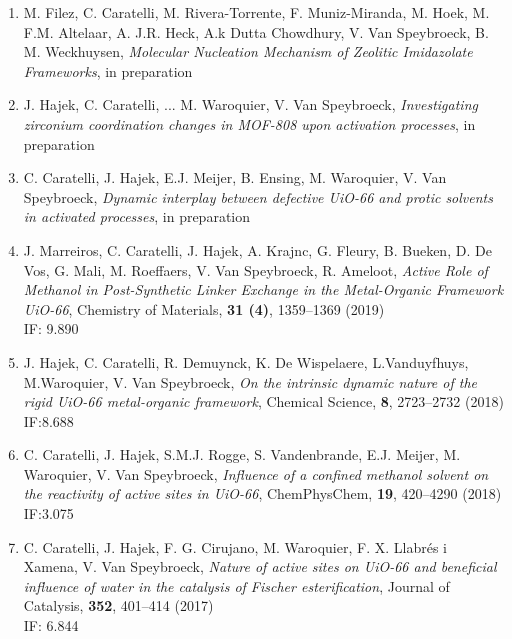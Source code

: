 \begin{enumerate}
\item
M. Filez, C. Caratelli, M. Rivera-Torrente, F. Muniz-Miranda, M. Hoek, M. F.M. Altelaar, A. J.R. Heck, A.k Dutta Chowdhury, V. Van Speybroeck, B. M. Weckhuysen, 
\textit{Molecular Nucleation Mechanism of Zeolitic Imidazolate Frameworks}, in preparation\\

\item
J. Hajek, C. Caratelli, ... M. Waroquier, V. Van Speybroeck, 
\textit{Investigating zirconium coordination changes in MOF-808 upon activation processes}, in preparation\\ 

\item
C. Caratelli, J. Hajek, E.J. Meijer, B. Ensing, M. Waroquier, V. Van Speybroeck, 
\textit{Dynamic interplay between defective UiO-66 and protic solvents in activated processes}, in preparation\\ 

\item
J. Marreiros, C. Caratelli, J. Hajek, A. Krajnc, G. Fleury, B. Bueken, D. De Vos, G. Mali, M. Roeffaers, V. Van Speybroeck, R. Ameloot, 
\textit{Active Role of Methanol in Post-Synthetic Linker Exchange in the Metal-Organic Framework UiO-66}, Chemistry of Materials, \textbf{31 (4)}, 1359--1369 (2019)\\ 
IF: 9.890

\item
J. Hajek, C. Caratelli, R. Demuynck, K. De Wispelaere, L.Vanduyfhuys, M.Waroquier, V. Van Speybroeck, 
\textit{On the intrinsic dynamic nature of the rigid UiO-66 metal-organic framework},  Chemical Science, \textbf{8}, 2723--2732 (2018)\\ IF:8.688

\item
C. Caratelli, J. Hajek, S.M.J. Rogge, S. Vandenbrande, E.J. Meijer, M. Waroquier, V. Van Speybroeck, 
\textit{Influence of a confined methanol solvent on the reactivity of active sites in UiO-66}, ChemPhysChem, \textbf{19}, 420--4290 (2018)\\ 
IF:3.075 

\item
C. Caratelli, J. Hajek, F. G. Cirujano, M. Waroquier, F. X. Llabr\'es i Xamena, V. Van Speybroeck, 
\textit{Nature of active sites on UiO-66 and beneficial influence of water in the catalysis of Fischer esterification},
Journal of Catalysis, \textbf{352}, 401--414 (2017) \\
IF: 6.844

\end{enumerate}

